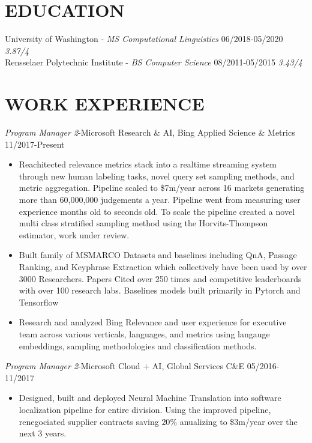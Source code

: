\documentclass[line,margin]{res}
\begin{document}
\address{Seattle, WA (415)-272-9964 \href{mailto:dfcf93@hotmail.com}{dfcf93@hotmail.com}}
\begin{resume}
\section{EDUCATION}
University of Washington - {\sl MS Computational Linguistics} 06/2018-05/2020 {\sl 3.87/4} \\
Rensselaer Polytechnic Institute - {\sl BS Computer Science} 08/2011-05/2015  {\sl 3.43/4} \\      
\section{WORK EXPERIENCE} 
{\sl Program Manager 2}-Microsoft Research \& AI,  Bing Applied Science \& Metrics  \hfill 11/2017-Present
\begin{itemize}  \itemsep -4pt 
\item Reachitected relevance metrics stack into a realtime streaming system through new human labeling tasks, novel query set sampling methods, and metric aggregation. Pipeline scaled to \$7m/year across 16 markets generating more than 60,000,000 judgements a year. Pipeline went from measuring user experience months old to seconds old. To scale the pipeline created a novel multi class stratified sampling method using the Horvits-Thompson estimator, work under review. 
\item  Built family of MSMARCO Datasets and baselines including QnA, Passage Ranking, and Keyphrase Extraction which collectively have been used by over 3000 Researchers. Papers Cited over 250 times and competitive leaderboards with over 100 research labs. Baselines models built primarily in Pytorch and Tensorflow
\item Research and analyzed Bing Relevance and user experience for executive team across various verticals, languages, and metrics using langauge embeddings, sampling methodologies and classification methods.
\end{itemize}
{\sl Program Manager 2}-Microsoft Cloud + AI, Global Services C\&E \hfill 05/2016-11/2017
\begin{itemize}  \itemsep -4pt
\item Designed, built and deployed Neural Machine Translation into software localization pipeline for entire division. Using the improved pipeline, renegociated supplier contracts saving $20\%$ anualizing to \$3m/year over the next 3 years.

\end{itemize}
\end{resume}
\end{document}
